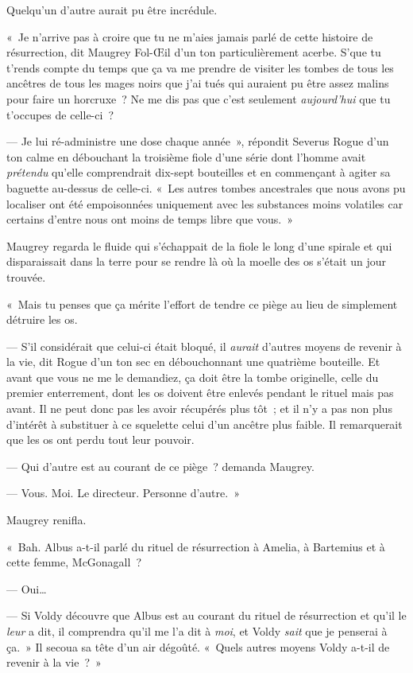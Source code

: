 Quelqu'un d'autre aurait pu être incrédule.

«~Je n'arrive pas à croire que tu ne m'aies jamais parlé de cette histoire de résurrection, dit Maugrey Fol-Œil d'un ton particulièrement acerbe. S'que tu t'rends compte du temps que ça va me prendre de visiter les tombes de tous les ancêtres de tous les mages noirs que j'ai tués qui auraient pu être assez malins pour faire un horcruxe~? Ne me dis pas que c'est seulement \emph{aujourd'hui} que tu t'occupes de celle-ci~?

--- Je lui ré-administre une dose chaque année~», répondit Severus Rogue d'un ton calme en débouchant la troisième fiole d'une série dont l'homme avait \emph{prétendu} qu'elle comprendrait dix-sept bouteilles et en commençant à agiter sa baguette au-dessus de celle-ci. «~Les autres tombes ancestrales que nous avons pu localiser ont été empoisonnées uniquement avec les substances moins volatiles car certains d'entre nous ont moins de temps libre que vous.~»

Maugrey regarda le fluide qui s'échappait de la fiole le long d'une spirale et qui disparaissait dans la terre pour se rendre là où la moelle des os s'était un jour trouvée.

«~Mais tu penses que ça mérite l'effort de tendre ce piège au lieu de simplement détruire les os.

--- S'il considérait que celui-ci était bloqué, il \emph{aurait} d'autres moyens de revenir à la vie, dit Rogue d'un ton sec en débouchonnant une quatrième bouteille. Et avant que vous ne me le demandiez, ça doit être la tombe originelle, celle du premier enterrement, dont les os doivent être enlevés pendant le rituel mais pas avant. Il ne peut donc pas les avoir récupérés plus tôt~; et il n'y a pas non plus d'intérêt à substituer à ce squelette celui d'un ancêtre plus faible. Il remarquerait que les os ont perdu tout leur pouvoir.

--- Qui d'autre est au courant de ce piège~? demanda Maugrey.

--- Vous. Moi. Le directeur. Personne d'autre.~»

Maugrey renifla.

«~Bah. Albus a-t-il parlé du rituel de résurrection à Amelia, à Bartemius et à cette femme, McGonagall~?

--- Oui…

--- Si Voldy découvre que Albus est au courant du rituel de résurrection et qu'il le \emph{leur} a dit, il comprendra qu'il me l'a dit à \emph{moi}, et Voldy \emph{sait} que je penserai à ça.~» Il secoua sa tête d'un air dégoûté. «~Quels autres moyens Voldy a-t-il de revenir à la vie~?~»

